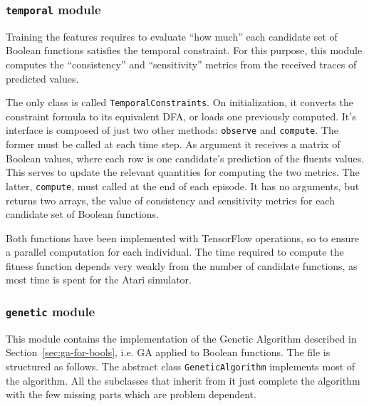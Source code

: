 \subsubsection*{\texttt{temporal} module}

Training the features requires to evaluate ``how much'' each candidate set of
Boolean functions satisfies the temporal constraint. For this purpose, this
module computes the ``consistency'' and ``sensitivity'' metrics from the
received traces of predicted values.

The only class is called \texttt{TemporalConstraints}. On initialization, it
converts the constraint formula to its equivalent DFA, or loads one previously
computed. It's interface is composed of just two other methods:
\texttt{observe} and \texttt{compute}. The former must be called at each time
step. As argument it receives a matrix of Boolean values, where each row is
one candidate's prediction of the fluents values. This serves to update the
relevant quantities for computing the two metrics. The latter,
\texttt{compute}, must called at the end of each episode. It has no arguments,
but returns two arrays, the value of consistency and sensitivity metrics for
each candidate set of Boolean functions.

Both functions have been implemented with TensorFlow operations, so to ensure
a parallel computation for each individual. The time required to compute the
fitness function depends very weakly from the number of candidate functions,
as most time is spent for the Atari simulator.


\subsubsection*{\texttt{genetic} module}

This module contains the implementation of the Genetic Algorithm described in
Section~\ref{sec:ga-for-bools}, i.e. GA applied to Boolean functions. The file
is structured as follows. The abstract class \texttt{GeneticAlgorithm}
implements most of the algorithm. All the subclasses that inherit from it
just complete the algorithm with the few missing parts which are problem
dependent.

